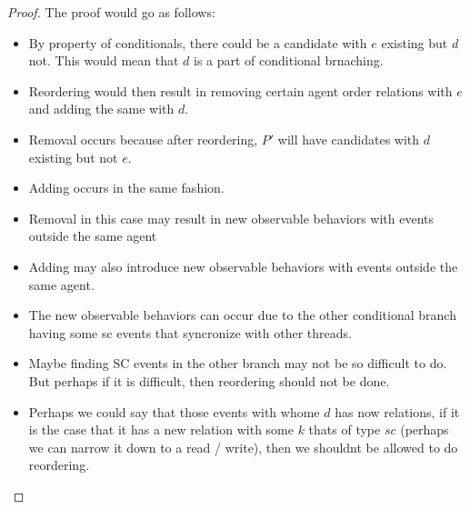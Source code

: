     \begin{proof}
        The proof would go as follows:
        \begin{itemize}
            \item By property of conditionals, there could be a candidate with $e$ existing but $d$ not. This would mean that $d$ is a part of conditional brnaching.
            \item Reordering would then result in removing certain agent order relations with $e$ and adding the same with $d$.
            \item Removal occurs because after reordering, $P'$ will have candidates with $d$ existing but not $e$. 
            \item Adding occurs in the same fashion.
            \item Removal in this case may result in new observable behaviors with events outside the same agent
            \item Adding may also introduce new observable behaviors with events outside the same agent. 
            \item The new observable behaviors can occur due to the other conditional branch having some sc events that syncronize with other threads.
            \item Maybe finding SC events in the other branch may not be so difficult to do. But perhaps if it is difficult, then reordering should not be done. 
            \item Perhaps we could say that those events with whome $d$ has now relations, if it is the case that it has a new relation with some $k$ thats of type $sc$ (perhaps we can narrow it down to a read / write), then we shouldnt be allowed to do reordering. 
        \end{itemize}
    \end{proof}

